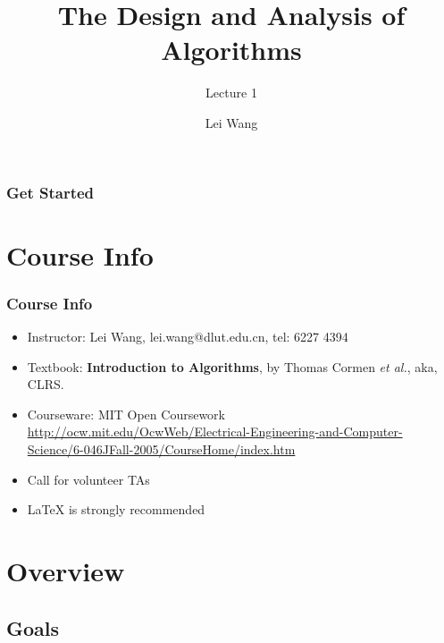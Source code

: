 \documentclass[notes,serif]{beamer}
\title{The Design and Analysis of Algorithms}
\subtitle{Lecture 1}
\author{Lei Wang}
\institute{Dalian University of Technology}
\begin{document}
\begin{frame}
  \titlepage
\end{frame}

\begin{frame}
  \frametitle{Get Started}
  \tableofcontents
\end{frame}

\section{Course Info}

\begin{frame}
\frametitle{Course Info}
\begin{itemize}
  \item Instructor: Lei Wang, lei.wang@dlut.edu.cn, tel: 6227 4394
  \item Textbook: {\bf Introduction to Algorithms}, by Thomas Cormen {\em et al.}, aka, CLRS.
  \item Courseware: MIT Open Coursework \\
  {\small \url{http://ocw.mit.edu/OcwWeb/Electrical-Engineering-and-Computer-Science/6-046JFall-2005/CourseHome/index.htm}}
  \item Call for volunteer TAs
  \item {\LaTeX} is strongly recommended
\end{itemize}
\end{frame}

\section{Overview}

\subsection{Goals}
\end{document}
